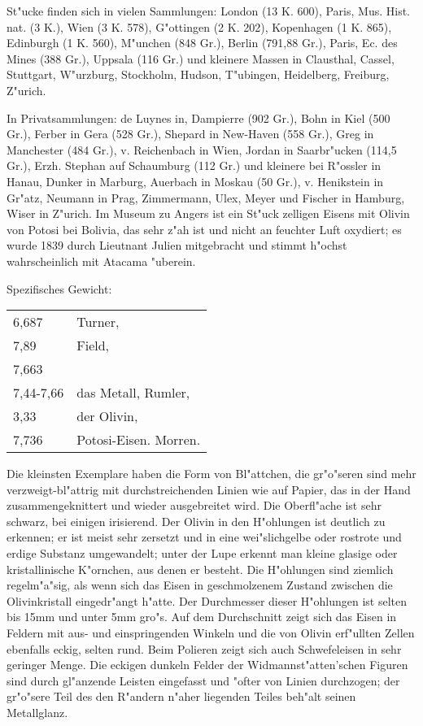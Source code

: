 \documentclass[a4paper, 11pt, oneside]{article}
\begin{document}
St"ucke finden sich in vielen Sammlungen: London (13 K. 600), Paris, Mus. Hist. nat. (3 K.), Wien (3 K. 578), G"ottingen (2 K. 202), Kopenhagen (1 K. 865), Edinburgh (1 K. 560), M"unchen (848 Gr.), Berlin (791,88 Gr.), Paris, Ec. des Mines (388 Gr.), Uppsala (116 Gr.) und kleinere Massen in Clausthal, Cassel, Stuttgart, W"urzburg, Stockholm, Hudson, T"ubingen, Heidelberg, Freiburg, Z"urich.

In Privatsammlungen: de Luynes in, Dampierre (902 Gr.), Bohn in Kiel (500 Gr.), Ferber in Gera (528 Gr.), Shepard in New-Haven (558 Gr.), Greg in Manchester (484 Gr.), v. Reichenbach in Wien, Jordan in Saarbr"ucken (114,5 Gr.), Erzh. Stephan auf Schaumburg (112 Gr.) und kleinere bei R"ossler in Hanau, Dunker in Marburg, Auerbach in Moskau (50 Gr.), v. Henikstein in Gr"atz, Neumann in Prag, Zimmermann, Ulex, Meyer und Fischer in Hamburg, Wiser in Z"urich. Im Museum zu Angers ist ein St"uck zelligen Eisens mit Olivin von Potosi bei Bolivia, das sehr z"ah ist und nicht an feuchter Luft oxydiert; es wurde 1839 durch Lieutnant Julien mitgebracht und stimmt h"ochst wahrscheinlich mit Atacama "uberein.

Spezifisches Gewicht:  
\begin{table}[!ht]
    \centering\swabfamily\Large
    \begin{tabular}{l l}
        6,687 & Turner,\\
        7,89 & Field,\\
        7,663 & \\
        7,44-7,66 & das Metall, Rumler,\\
        3,33 & der Olivin,\\
        7,736 & Potosi-Eisen. Morren.
    \end{tabular}
\end{table}

Die kleinsten Exemplare haben die Form von Bl"attchen, die gr"o"seren sind mehr verzweigt-bl"attrig mit durchstreichenden Linien wie auf Papier, das in der Hand zusammengeknittert und wieder ausgebreitet wird. Die Oberfl"ache ist sehr schwarz, bei einigen irisierend. Der Olivin in den H"ohlungen ist deutlich zu erkennen; er ist meist sehr zersetzt und in eine wei"slichgelbe oder rostrote und erdige Substanz umgewandelt; unter der Lupe erkennt man kleine glasige oder kristallinische K"ornchen, aus denen er besteht. Die H"ohlungen sind ziemlich regelm"a"sig, als wenn sich das Eisen in geschmolzenem Zustand zwischen die Olivinkristall eingedr"angt h"atte. Der Durchmesser dieser H"ohlungen ist selten bis 15mm und unter 5mm gro"s. Auf dem Durchschnitt zeigt sich das Eisen in Feldern mit aus- und einspringenden Winkeln und die von Olivin erf"ullten Zellen ebenfalls eckig, selten rund. Beim Polieren zeigt sich auch Schwefeleisen in sehr geringer Menge. Die eckigen dunkeln Felder der Widmannst"atten'schen Figuren sind durch gl"anzende Leisten eingefasst und "ofter von Linien durchzogen; der gr"o"sere Teil des den R"andern n"aher liegenden Teiles beh"alt seinen Metallglanz.
\end{document}
